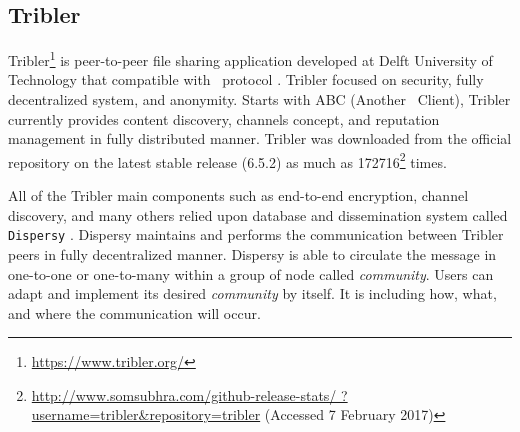 
\subsection{Tribler}
\label{section:tribler}
Tribler\footnote{\url{https://www.tribler.org/}} is peer-to-peer file sharing application developed at Delft University of Technology that compatible with \bt~protocol \cite{2008:tribler:pouwelse}. Tribler focused on security, fully decentralized system, and anonymity. Starts with ABC (Another \bt~Client), Tribler currently provides content discovery, channels concept, and reputation management in fully distributed manner. Tribler was downloaded from the official repository on the latest stable release (6.5.2) as much as  172716\footnote{\url{http://www.somsubhra.com/github-release-stats/ ?username=tribler&repository=tribler} (Accessed 7 February 2017)} times.

All of the Tribler main components such as end-to-end encryption, channel discovery, and many others relied upon database and dissemination system called \texttt{Dispersy} \cite{2013:dispersy:zeilemaker}. Dispersy maintains and performs the communication between Tribler peers in fully decentralized manner. Dispersy is able to circulate the message in one-to-one or one-to-many within a group of node called \textit{community}. Users can adapt and implement its desired \textit{community} by itself. It is including how, what, and where the communication will occur.

